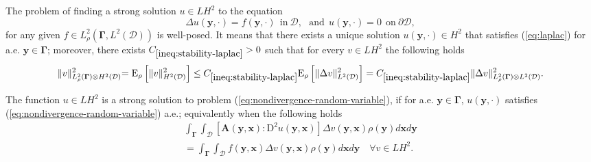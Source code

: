 \documentclass[final,onefignum,onetabnum]{mousaviart}
\begin{document}
	\vspace*{1mm}
	\begin{lemma}
		\label{rem:well-posedness-laplac-eq}
		The problem of finding a strong solution $u \in LH^2$ to the equation
		\begin{equation}
			\label{eq:laplac}
			\Delta u(\boldsymbol{y}, \cdot) = f (\boldsymbol{y}, \cdot) 
			~~ \mathrm{in}~\mathcal{D},
			~~~ \mathrm{and}~~
			u(\boldsymbol{y}, \cdot) = 0 ~ ~\mathrm{on}~ \partial \mathcal{D},
		\end{equation}
		for any given $f \in L^2_{\rho}(\boldsymbol{\Gamma}, L^2(\mathcal{D}))$ is well-posed. It means that there exists a unique solution $u(\boldsymbol{y}, \cdot) \in H^2$ that satisfies (\ref{eq:laplac}) for a.e. $\boldsymbol{y} \in \boldsymbol{\Gamma}$; moreover, there exists $C_{\ref{ineq:stability-laplac}}>0$ such that for every $ v \in LH^2$ the following holds
		\begin{equation}
			\label{ineq:stability-laplac}
			\rVert v \lVert_{L^2_{\rho}(\boldsymbol{\Gamma}) \otimes H^2(\mathcal{D})}^2
			=
			\mathrm{E}_{\rho}\left[ \lVert v\rVert_{H^2(\mathcal{D})}^2 \right] 
			\leq 
			C_{\ref{ineq:stability-laplac}}
			\mathrm{E}_{\rho} \left[ \lVert \Delta v \rVert _{L^2(\mathcal{D})}^2 \right]  
			= C_{\ref{ineq:stability-laplac}} 
			\rVert  \Delta v \rVert _{L^2_{\rho}(\boldsymbol{\Gamma}) \otimes L^2(\mathcal{D})}^2
			.
		\end{equation}
	\end{lemma}
	
	\vspace*{1mm}
	\begin{definition} 
		The function $u \in LH^2 $ is a strong solution to problem (\ref{eq:nondivergence-random-variable}), if 
		for a.e. $\boldsymbol{y} \in \boldsymbol{\Gamma}$, $u(\boldsymbol{y}, \cdot)$ satisfies (\ref{eq:nondivergence-random-variable}) a.e.;  equivalently when the following holds 
		\begin{multline}
			\label{eq:weak-form}
			\int_{\boldsymbol{\Gamma}} \int_{\mathcal{D}} {\left[ \boldsymbol{A}( \boldsymbol{y}, \boldsymbol{x}): \mathrm{D}^2u( \boldsymbol{y}, \boldsymbol{x})\right]  \Delta v(\boldsymbol{y}, \boldsymbol{x}) \rho(\boldsymbol{y}) d\boldsymbol{x}  d \boldsymbol{y} }  
			\\
			=
			\int_{\boldsymbol{\Gamma}} \int_{\mathcal{D}} { f(\boldsymbol{y}, \boldsymbol{x}) \Delta v(\boldsymbol{y}, \boldsymbol{x}) \rho(\boldsymbol{y}) d\boldsymbol{x}  d \boldsymbol{y} } 
			\quad \forall v \in LH^2.
		\end{multline}
	\end{definition}
	
\end{document}
